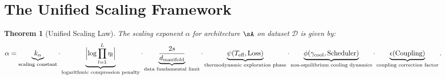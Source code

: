 \documentclass[11pt, a4paper]{article}
\newtheorem{theo}{Theorem}[section]
\theoremstyle{plain}
\def\sD{{\mathcal D}}
\begin{document}
\section{The Unified Scaling Framework}

\begin{theo}[Unified Scaling Law]\label{theo:unified_scaling}
The scaling exponent $\alpha$ for architecture $\sA$ on dataset $\sD$ is given by:
\begin{equation}
\alpha = \underbrace{k_\alpha}_{\text{scaling constant}} \cdot \underbrace{\Bigl|\log\prod_{l=1}^{L} \eta_l\Bigr|}_{\text{logarithmic compression penalty}} \cdot \underbrace{\frac{2s}{d_{\text{manifold}}}}_{\text{data fundamental limit}} \cdot \underbrace{\psi(T_{\text{eff}}, \text{Loss})}_{\text{thermodynamic exploration phase}} \cdot \underbrace{\phi(\gamma_{\text{cool}}, \text{Scheduler})}_{\text{non-equilibrium cooling dynamics}} \cdot \underbrace{\epsilon(\text{Coupling})}_{\text{coupling correction factor}}.
\label{eq:unified_scaling}
\end{equation}
\end{theo}
\end{document}
